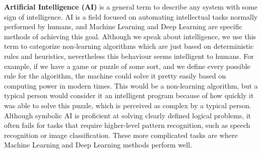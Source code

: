 \textbf{Artificial Intelligence (AI)} is a general term to describe any system with some sign of intelligence. AI is a field focused on automating intellectual tasks normally performed by humans, and Machine Learning and Deep Learning are specific methods of achieving this goal.\cite{AI-ML-DL} Although we speak about intelligence, we use this term to categorize non-learning algorithms which are just based on deterministic rules and heuristics, nevertheless this behaviour seems intelligent to humans. For example, if we have a game or puzzle of some sort, and we define every possible rule for the algorithm, the machine could solve it pretty easily based on computing power in modern times. This would be a non-learning algorithm, but a typical person would consider it an intelligent program because of how quickly it was able to solve this puzzle, which is perceived as complex by a typical person. Although symbolic AI is proficient at solving clearly defined logical problems, it often fails for tasks that require higher-level pattern recognition, such as speech recognition or image classification. These more complicated tasks are where Machine Learning and Deep Learning methods perform well\cite{AI-ML-DL}.

